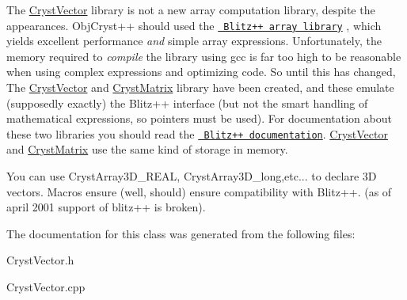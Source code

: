 The \mbox{\hyperlink{class_cryst_vector}{Cryst\+Vector}} library is not a new array computation library, despite the appearances. Obj\+Cryst++ should used the \href{http://www.oonumerics.org/blitz/}{\texttt{ Blitz++ array library}} , which yields excellent performance {\itshape and} simple array expressions. Unfortunately, the memory required to {\itshape compile} the library using gcc is far too high to be reasonable when using complex expressions and optimizing code. So until this has changed, The \mbox{\hyperlink{class_cryst_vector}{Cryst\+Vector}} and \mbox{\hyperlink{class_cryst_matrix}{Cryst\+Matrix}} library have been created, and these emulate (supposedly exactly) the Blitz++ interface (but not the smart handling of mathematical expressions, so pointers must be used). For documentation about these two libraries you should read the \href{http://www.oonumerics.org/blitz/manual/}{\texttt{ Blitz++ documentation}}. \mbox{\hyperlink{class_cryst_vector}{Cryst\+Vector}} and \mbox{\hyperlink{class_cryst_matrix}{Cryst\+Matrix}} use the same kind of storage in memory.

You can use Cryst\+Array3\+D\+\_\+\+R\+E\+AL, Cryst\+Array3\+D\+\_\+long,etc... to declare 3D vectors. Macros ensure (well, should) ensure compatibility with Blitz++. (as of april 2001 support of blitz++ is broken). 

The documentation for this class was generated from the following files\+:\begin{DoxyCompactItemize}
\item 
Cryst\+Vector.\+h\item 
Cryst\+Vector.\+cpp\end{DoxyCompactItemize}
